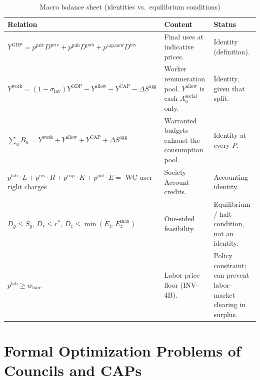 \documentclass[10pt,twoside,openany]{book}
\theoremstyle{dpepstyle}
\begin{document}
\begin{table}[htbp]
\centering
\caption{Macro balance sheet (identities vs.\ equilibrium conditions)}
\label{tab:macro-sheet}
\scriptsize
\begin{tabularx}{\textwidth}{L{1.55in} Y L{1.15in}}
\toprule
\textbf{Relation} & \textbf{Content} & \textbf{Status} \\
\midrule
$Y^{\text{GDP}} = p^{\text{priv}}D^{\text{priv}} + p^{\text{pub}}D^{\text{pub}} + p^{\text{cap,new}}D^{\text{inv}}$ & Final uses at indicative prices. & Identity (definition). \\
$Y^{\text{work}} = (1-\sigma_{\text{inv}})Y^{\text{GDP}} - Y^{\text{allow}} - Y^{\text{CAP}} - \Delta S^{\text{agg}}$ & Worker remuneration pool. $Y^{\text{allow}}$ is cash $A_u^{\text{social}}$ only. & Identity, given that split. \\
$\sum_u B_u = Y^{\text{work}} + Y^{\text{allow}} + Y^{\text{CAP}} + \Delta S^{\text{agg}}$ & Warranted budgets exhaust the consumption pool. & Identity at every $P$. \\
$p^{\text{lab}}\cdot L + p^{\text{res}}\cdot R + p^{\text{cap}}\cdot K + p^{\text{pol}}\cdot E = $ WC user-right charges & Society Account credits. & Accounting identity. \\
$D_g \le S_g$, $D_r \le r^*$, $D_z \le \min(E_z,E_z^{\max})$ & One-sided feasibility. & Equilibrium / halt condition, not an identity. \\
$p^{\text{lab}} \ge w_{\text{base}}$ & Labor price floor (INV-4B). & Policy constraint; can prevent labor-market clearing in surplus. \\
\bottomrule
\end{tabularx}
\end{table}

\section{Formal Optimization Problems of Councils and CAPs}
\label{sec:optimization}
\end{document}
